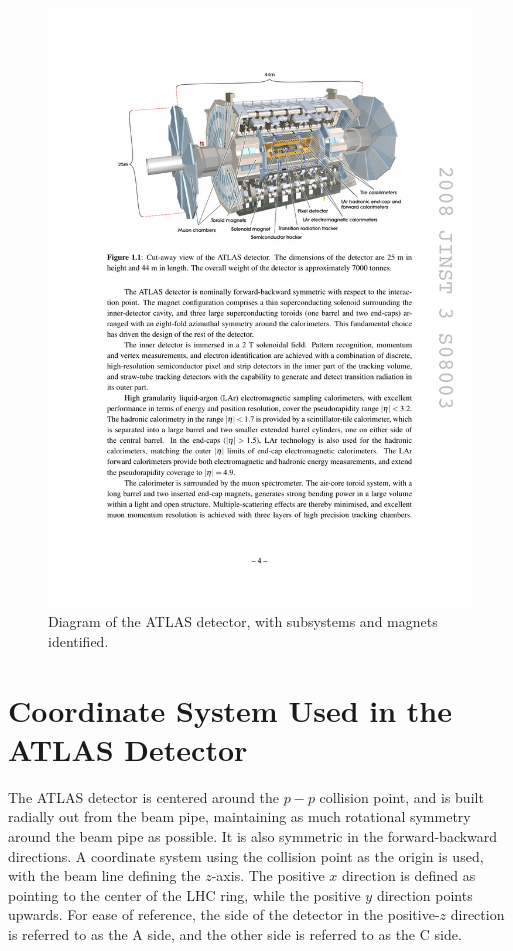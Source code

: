 \begin{centering}
\begin{figure}[bth]
\myfloatalign
\includegraphics[width=.90\linewidth]{figures/atlas/detector.pdf}
\caption{Diagram of the ATLAS detector, with subsystems and magnets identified.}
\label{fig:detector}
\end{figure}
\end{centering}

\section{Coordinate System Used in the ATLAS Detector}
\label{sec:coords}

The ATLAS detector is centered around the $p-p$ collision point, and is built radially out from the beam pipe, maintaining as much rotational symmetry around the beam pipe as possible. It is also symmetric in the forward-backward directions. A coordinate system using the collision point as the origin is used, with the beam line defining the $z$-axis. The positive $x$ direction is defined as pointing to the center of the \ac{LHC} ring, while the positive $y$ direction points upwards. For ease of reference, the side of the detector in the positive-$z$ direction is referred to as the A side, and the other side is referred to as the C side. 

